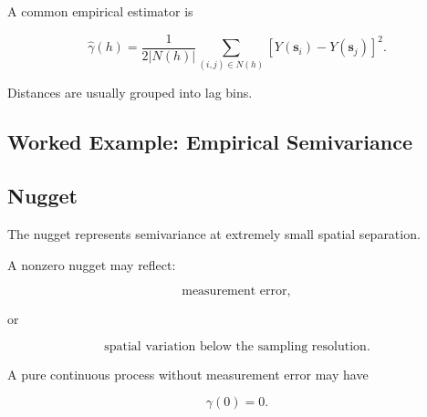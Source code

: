 A common empirical estimator is

\[
\boxed{
\widehat{\gamma}(h)
=
\frac{
1
}{
2|N(h)|
}
\sum_{(i,j)\in N(h)}
[
Y(\mathbf{s}_i)
-
Y(\mathbf{s}_j)
]^2.
}
\]

Distances are usually grouped into lag bins.

\subsection{Worked Example: Empirical Semivariance}
\label{subsec:worked-empirical-semivariance}


\subsection{Nugget}
\label{subsec:variogram-nugget}

The nugget represents semivariance at extremely small spatial separation.

A nonzero nugget may reflect:

\[
\boxed{
\text{measurement error},
}
\]

or

\[
\boxed{
\text{spatial variation below the sampling resolution}.
}
\]

A pure continuous process without measurement error may have

\[
\gamma(0)=0.
\]

